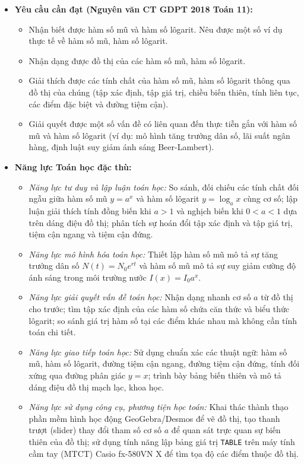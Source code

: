 \documentclass[12pt, a4paper]{article}
\begin{document}
\begin{itemize}[leftmargin=1.2cm]
    \item \textbf{Yêu cầu cần đạt (Nguyên văn CT GDPT 2018 Toán 11):}
    \begin{itemize}[leftmargin=0.6cm]
        \item Nhận biết được hàm số mũ và hàm số lôgarit. Nêu được một số ví dụ thực tế về hàm số mũ, hàm số lôgarit.
        \item Nhận dạng được đồ thị của các hàm số mũ, hàm số lôgarit.
        \item Giải thích được các tính chất của hàm số mũ, hàm số lôgarit thông qua đồ thị của chúng (tập xác định, tập giá trị, chiều biến thiên, tính liên tục, các điểm đặc biệt và đường tiệm cận).
        \item Giải quyết được một số vấn đề có liên quan đến thực tiễn gắn với hàm số mũ và hàm số lôgarit (ví dụ: mô hình tăng trưởng dân số, lãi suất ngân hàng, định luật suy giảm ánh sáng Beer-Lambert).
    \end{itemize}

    \item \textbf{Năng lực Toán học đặc thù:}
    \begin{itemize}[leftmargin=0.6cm]
        \item \textit{Năng lực tư duy và lập luận toán học:} So sánh, đối chiếu các tính chất đối ngẫu giữa hàm số mũ $y = a^x$ và hàm số lôgarit $y = \log_a x$ cùng cơ số; lập luận giải thích tính đồng biến khi $a > 1$ và nghịch biến khi $0 < a < 1$ dựa trên dáng điệu đồ thị; phân tích sự hoán đổi tập xác định và tập giá trị, tiệm cận ngang và tiệm cận đứng.
        \item \textit{Năng lực mô hình hóa toán học:} Thiết lập hàm số mũ mô tả sự tăng trưởng dân số $N(t) = N_0 e^{rt}$ và hàm số mũ mô tả sự suy giảm cường độ ánh sáng trong môi trường nước $I(x) = I_0 a^x$.
        \item \textit{Năng lực giải quyết vấn đề toán học:} Nhận dạng nhanh cơ số $a$ từ đồ thị cho trước; tìm tập xác định của các hàm số chứa căn thức và biểu thức lôgarit; so sánh giá trị hàm số tại các điểm khác nhau mà không cần tính toán chi tiết.
        \item \textit{Năng lực giao tiếp toán học:} Sử dụng chuẩn xác các thuật ngữ: hàm số mũ, hàm số lôgarit, đường tiệm cận ngang, đường tiệm cận đứng, tính đối xứng qua đường phân giác $y = x$; trình bày bảng biến thiên và mô tả dáng điệu đồ thị mạch lạc, khoa học.
        \item \textit{Năng lực sử dụng công cụ, phương tiện học toán:} Khai thác thành thạo phần mềm hình học động GeoGebra/Desmos để vẽ đồ thị, tạo thanh trượt (slider) thay đổi tham số cơ số $a$ để quan sát trực quan sự biến thiên của đồ thị; sử dụng tính năng lập bảng giá trị \texttt{TABLE} trên máy tính cầm tay (MTCT) Casio fx-580VN X để tìm tọa độ các điểm thuộc đồ thị.
    \end{itemize}


\end{itemize}
\end{document}
